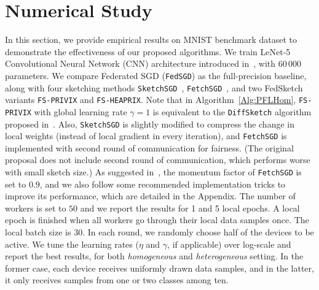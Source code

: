 \documentclass{article}
\begin{document}
\vspace{-0.05in}
\section{Numerical Study}\label{sec:experiment}
\vspace{-0.05in}

In this section, we provide empirical results on MNIST benchmark dataset to demonstrate the effectiveness of our proposed algorithms. 
We train LeNet-5 Convolutional Neural Network (CNN) architecture introduced in~\citet{lecun1998gradient}, with $60\,000$ parameters.
We compare Federated SGD (\texttt{FedSGD}) as the full-precision baseline, along with four sketching methods \texttt{SketchSGD}~\citep{ivkin2019communication}, \texttt{FetchSGD}~\cite{rothchild2020fetchsgd}, and two FedSketch variants \texttt{FS-PRIVIX} and \texttt{FS-HEAPRIX}.
Note that in Algorithm~\ref{Alg:PFLHom}, \texttt{FS-PRIVIX} with global learning rate $\gamma=1$ is equivalent to the \texttt{DiffSketch} algorithm proposed in~\citet{li2018federated}. Also, \texttt{SketchSGD} is slightly modified to compress the change in local weights (instead of local gradient in every iteration), and \texttt{FetchSGD} is implemented with second round of communication for fairness. (The original proposal does not include second round of communication, which performs worse with small sketch size.) As suggested in~\cite{rothchild2020fetchsgd}, the momentum factor of \texttt{FetchSGD} is set to $0.9$, and we also follow some recommended implementation tricks to improve its performance, which are detailed in the Appendix.
The number of workers is set to $50$ and we report the results for 1 and 5 local epochs. A local epoch is finished when all workers go through their local data samples once. The local batch size is 30. In each round, we randomly choose half of the devices to be active. 
We tune the learning rates ($\eta$ and $\gamma$, if applicable) over log-scale and report the best results, for both \emph{homogeneous} and \emph{heterogeneous} setting. 
In the former case, each device receives uniformly drawn data samples, and in the latter, it only receives samples from one or two classes among ten. 
\end{document}
